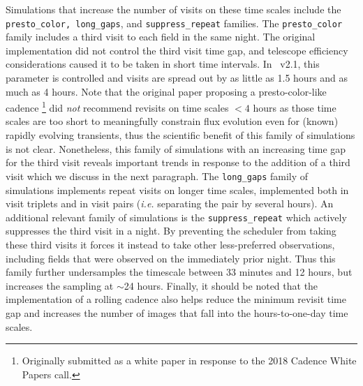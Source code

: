 Simulations that increase the number of visits on these time scales include the \texttt{presto\_color, long\_gaps}, and \texttt{suppress\_repeat} families. The \texttt{presto\_color} family includes a third visit to each field in the same night. The original implementation did not control the third visit time gap, and telescope efficiency considerations caused it to be taken in short time intervals. In \opsim\ v2.1, this parameter is controlled and visits are spread out by as little as 1.5 hours and as much as 4 hours. Note that the original paper proposing a presto-color-like cadence \citep{2019PASP..131f8002B}\footnote{Originally submitted as a white paper in response to the 2018 Cadence White Papers call.} did \emph{not} recommend revisits on time scales $<4$ hours as those time scales are too short to meaningfully constrain flux evolution even for (known) rapidly evolving transients, thus the scientific benefit of this family of simulations is not clear. Nonetheless, this family of simulations with an increasing time gap for the third visit reveals important trends in response to the addition of a third visit which we discuss in the next paragraph. The \texttt{long\_gaps} family of simulations implements repeat visits on longer time scales, implemented both in visit triplets and in visit pairs (\emph{i.e.} separating the pair by several hours).
An additional relevant family of simulations is the \texttt{suppress\_repeat} which actively suppresses the third visit in a night. By preventing the scheduler from taking these third visits it forces it instead to take other less-preferred observations, including fields that were observed on the immediately prior night. Thus this family further undersamples the timescale between 33 minutes and 12 hours, but increases the sampling at $\sim$24 hours. Finally, it should be noted that the implementation of a rolling cadence also helps reduce the minimum revisit time gap and increases the number of images that fall into the hours-to-one-day time scales.


